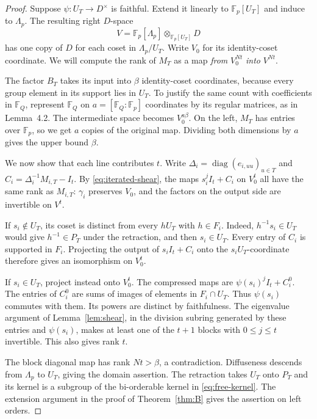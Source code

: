 \documentclass[11pt,a4paper]{article}
\numberwithin{equation}{section}
\DeclareMathOperator{\diag}{diag}
\newcommand{\F}{\mathbb F}
\begin{document}
\begin{proof}
Suppose \(\psi:U_T\to D^\times\) is faithful. Extend it linearly to \(\F_p[U_T]\) and induce to \(\Lambda_p\). The resulting right \(D\)-space
\[
       V=\F_p[\Lambda_p]\otimes_{\F_p[U_T]}D
\]
has one copy of \(D\) for each coset in \(\Lambda_p/U_T\). Write \(V_0\) for its identity-coset coordinate. We will compute the rank of \(M_T\) as a map \emph{from} \(V_0^{Nt}\) \emph{into} \(V^{Nt}\).

The factor \(B_T\) takes its input into \(\beta\) identity-coset coordinates, because every group element in its support lies in \(U_T\). To justify the same count with coefficients in \(\F_Q\), represent \(\F_Q\) on \(a=[\F_Q:\F_p]\) coordinates by its regular matrices, as in Lemma~4.2. The intermediate space becomes \(V_0^{a\beta}\). On the left, \(M_T\) has entries over \(\F_p\), so we get \(a\) copies of the original map. Dividing both dimensions by \(a\) gives the upper bound \(\beta\).

We now show that each line contributes \(t\). Write \(\Delta_i=\diag(e_{i,uu})_{u\in T}\) and \(C_i=\Delta_i^{-1}M_{i,T}-I_t\). By \eqref{eq:iterated-shear}, the maps \(s_i^j I_t+C_i\) on \(V_0^t\) all have the same rank as \(M_{i,T}\): \(\gamma_i\) preserves \(V_0\), and the factors on the output side are invertible on \(V^t\).

If \(s_i\notin U_T\), its coset is distinct from every \(hU_T\) with \(h\in F_i\). Indeed, \(h^{-1}s_i\in U_T\) would give \(h^{-1}\in P_T\) under the retraction, and then \(s_i\in U_T\). Every entry of \(C_i\) is supported in \(F_i\). Projecting the output of \(s_iI_t+C_i\) onto the \(s_iU_T\)-coordinate therefore gives an isomorphism on \(V_0^t\).

If \(s_i\in U_T\), project instead onto \(V_0^t\). The compressed maps are \(\psi(s_i)^j I_t+C_i^0\). The entries of \(C_i^0\) are sums of images of elements in \(F_i\cap U_T\). Thus \(\psi(s_i)\) commutes with them. Its powers are distinct by faithfulness. The eigenvalue argument of Lemma~\ref{lem:shear}, in the division subring generated by these entries and \(\psi(s_i)\), makes at least one of the \(t+1\) blocks with \(0\le j\le t\) invertible. This also gives rank \(t\).

The block diagonal map has rank \(Nt>\beta\), a contradiction. Diffuseness descends from \(\Lambda_p\) to \(U_T\), giving the domain assertion. The retraction takes \(U_T\) onto \(P_T\) and its kernel is a subgroup of the bi-orderable kernel in \eqref{eq:free-kernel}. The extension argument in the proof of Theorem~\ref{thm:B} gives the assertion on left orders.
\end{proof}
\end{document}

